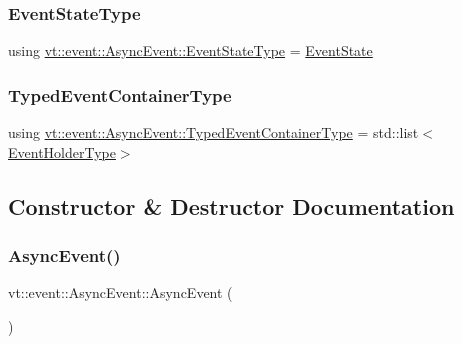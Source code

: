 \mbox{\label{structvt_1_1event_1_1_async_event_a35f2dfb3322fc042d4561ce1e119a0c8}} 
\subsubsection{\texorpdfstring{Event\+State\+Type}{EventStateType}}
{\footnotesize\ttfamily using \hyperlink{namespacevt_1_1event_a787aca6361696d96d817a639195c429c}{vt\+::event\+::\+Async\+Event\+::\+Event\+State\+Type} =  \hyperlink{namespacevt_1_1event_a787aca6361696d96d817a639195c429c}{Event\+State}}

\mbox{\label{structvt_1_1event_1_1_async_event_af0397f32fb9d7dd136c544737eeb7796}} 
\subsubsection{\texorpdfstring{Typed\+Event\+Container\+Type}{TypedEventContainerType}}
{\footnotesize\ttfamily using \hyperlink{structvt_1_1event_1_1_async_event_af0397f32fb9d7dd136c544737eeb7796}{vt\+::event\+::\+Async\+Event\+::\+Typed\+Event\+Container\+Type} =  std\+::list$<$\hyperlink{structvt_1_1event_1_1_async_event_a6b529d829ccb5b12c50c2b1978c41a86}{Event\+Holder\+Type}$>$}



\subsection{Constructor \& Destructor Documentation}
\mbox{\label{structvt_1_1event_1_1_async_event_ad9837496e616789010bdbeefa968639d}} 
\subsubsection{\texorpdfstring{Async\+Event()}{AsyncEvent()}}
{\footnotesize\ttfamily vt\+::event\+::\+Async\+Event\+::\+Async\+Event (\begin{DoxyParamCaption}{ }\end{DoxyParamCaption})\hspace{0.3cm}{\ttfamily [default]}}

